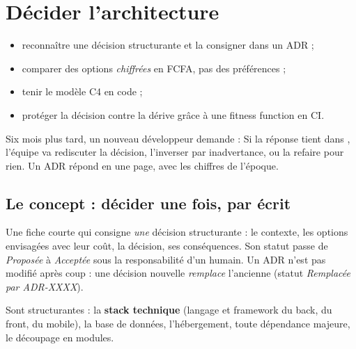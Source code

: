 \chapter{Décider l'architecture}\label{ch:archi}

\begin{objectifs}
\begin{itemize}
  \item reconnaître une décision structurante et la consigner dans un ADR ;
  \item comparer des options \emph{chiffrées} en FCFA, pas des préférences ;
  \item tenir le modèle C4 en code ;
  \item protéger la décision contre la dérive grâce à une fitness function en CI.
\end{itemize}
\end{objectifs}

\begin{situation}
Six mois plus tard, un nouveau développeur demande : 
Si la réponse tient dans \emph{}, l'équipe va rediscuter la décision, l'inverser par
inadvertance, ou la refaire pour rien. Un ADR répond en une page, avec les chiffres de l'époque.
\end{situation}

\section{Le concept : décider une fois, par écrit}
\begin{concept}
Une fiche courte qui consigne \emph{une} décision structurante : le contexte, les options envisagées avec
leur coût, la décision, ses conséquences. Son statut passe de \emph{Proposée} à \emph{Acceptée} sous la
responsabilité d'un humain. Un ADR n'est pas modifié après coup : une décision nouvelle \emph{remplace} l'ancienne
(statut \emph{Remplacée par ADR-XXXX}).
\end{concept}

Sont structurantes : la \textbf{stack technique} (langage et framework du back, du front, du mobile), la base de
données, l'hébergement, toute dépendance majeure, le découpage en modules.


